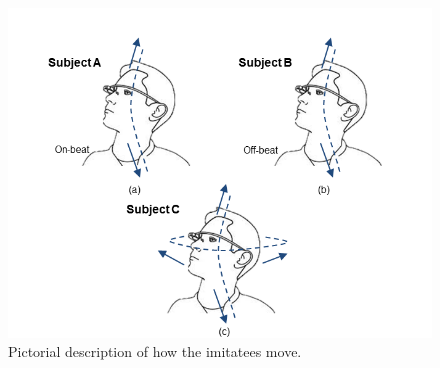 




\begin{figure}
\vspace{-1mm}
\centering
\includegraphics[width = .75\columnwidth]{figure/imitation_subject_movement.png}
\caption{\label{fig:imitation_movement} Pictorial description of how the imitatees move.}
\vspace{-1mm}
\end{figure}

 